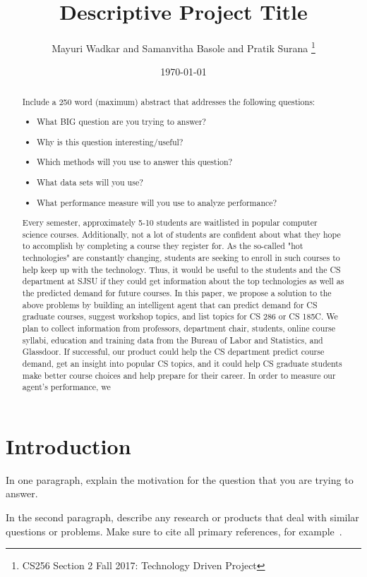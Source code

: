 \documentclass{article}
\title{Descriptive Project Title}
\author{Mayuri Wadkar and Samanvitha Basole and Pratik Surana
\thanks{CS256 Section 2 Fall 2017: Technology Driven Project}}
\date{\today}
\begin{document}
\maketitle

\begin{abstract}
Include a 250 word (maximum) abstract that addresses the following questions:
\begin{itemize}
\item What BIG question are you trying to answer?
\item Why is this question interesting/useful?
\item Which methods will you use to answer this question?
\item What data sets will you use?
\item What performance measure will you use to analyze performance?
\end{itemize}
Every semester, approximately 5-10 students are waitlisted in popular computer science courses. 
Additionally, not a lot of students are confident about what they hope to accomplish by completing a course they register for. As the so-called "hot technologies" are constantly changing, students are seeking to enroll in such courses to help keep up with the technology. Thus, it would be useful to the students and the CS department at SJSU if they could get information about the top technologies as well as the predicted demand for future courses. In this paper, we propose a solution to the above problems by building an intelligent agent that can predict demand for CS graduate courses, suggest workshop topics, and list topics for CS 286 or CS 185C. We plan to collect information from professors, department chair, students, online course syllabi, education and training data from the Bureau of Labor and Statistics, and Glassdoor. If successful, our product could help the CS department predict course demand, get an insight into popular CS topics, and it could help CS graduate students make better course choices and help prepare for their career. In order to measure our agent's performance, we 
\end{abstract}

\section{Introduction}

In one paragraph, explain the motivation for the question that you are trying to answer. 

In the second paragraph, describe any research or products that deal with similar questions or problems.  Make sure to cite all primary references, for example~\cite{einstein}.
\end{document}
